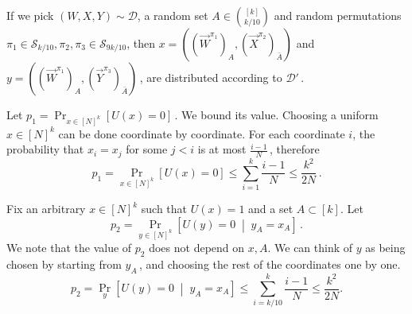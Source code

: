 \documentclass{toc}
\newcommand{\Prob}[2][]{\Pr_{{#1}}\left[#2\right]} %
\newcommand{\brac}[1]{[#1]} %
\newcommand{\given}{\;\middle\vert\;} %
\newcommand\rest[1]{{\bar{#1}}}  %
\begin{document}
If we pick $(W,X,Y)\sim\mathcal{D}$, a random set $A\in\binom{[k]}{k/10}$ and  random permutations 
$\pi_1\in \mathcal{S}_{k/10},\pi_2,\pi_3\in \mathcal{S}_{9k/10}$, %
then $x=((\vec W^{\pi_1})_A,(\vec X^{\pi_2})_\rest{A})$ and $y=((\vec W^{\pi_1})_A,(\vec Y^{\pi_3})_\rest{A})$\,, are distributed according to $\mathcal{D}'$\,.


Let $p_1 = \Prob[x\in\brac{N}^k]{U(x)=0}$\,. We bound its value. Choosing a uniform $x\in[N]^k$ can be done coordinate by coordinate. For each coordinate $i$, the probability that $x_i=x_j$ for some $j<i$ is at most $\frac{i-1}{N}$\,, therefore
\[ p_1 =  \Prob[x\in\brac{N}^k]{U(x)=0} \leq \sum_{i=1}^{k}\frac{i-1}{N}\leq\frac{k^2}{2N}\,. \]%

Fix an arbitrary $x\in[N]^k$ such that $U(x)=1$ and a set $A\subset[k]$.
Let
%
\[p_2 = \Prob[{y\in [N]^k}]{U(y)=0\given y_A=x_A}\,.\]  %
We note that the value of $p_2$ does not depend on $x,A$. We can think of $y$ as being chosen by starting from $y_A$\,, and choosing the rest of the coordinates one by one.
\[ p_2 = \Prob[y]{U(y)=0\given y_A=x_A} \leq \sum_{i=k/10}^{k}\frac{i-1}{N}\leq \frac{k^2}{2N}. \]
\end{document}
